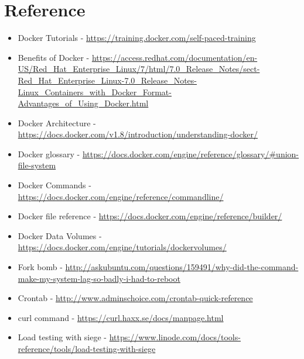 \documentclass[11pt]{article}
\begin{document}
\section{Reference}
\label{sec:orgheadline51}
\begin{itemize}
\item Docker Tutorials -  \url{https://training.docker.com/self-paced-training}
\item Benefits of Docker - \url{https://access.redhat.com/documentation/en-US/Red_Hat_Enterprise_Linux/7/html/7.0_Release_Notes/sect-Red_Hat_Enterprise_Linux-7.0_Release_Notes-Linux_Containers_with_Docker_Format-Advantages_of_Using_Docker.html}
\item Docker Architecture - \url{https://docs.docker.com/v1.8/introduction/understanding-docker/}
\item Docker glossary -  \url{https://docs.docker.com/engine/reference/glossary/#union-file-system}
\item Docker Commands - \url{https://docs.docker.com/engine/reference/commandline/}
\item Docker file reference - \url{https://docs.docker.com/engine/reference/builder/}
\item Docker Data Volumes - \url{https://docs.docker.com/engine/tutorials/dockervolumes/}

\item Fork bomb -
\url{http://askubuntu.com/questions/159491/why-did-the-command-make-my-system-lag-so-badly-i-had-to-reboot}
\item Crontab - \url{http://www.adminschoice.com/crontab-quick-reference}
\item curl command - \url{https://curl.haxx.se/docs/manpage.html}
\item Load testing with siege -
\url{https://www.linode.com/docs/tools-reference/tools/load-testing-with-siege}
\end{itemize}
\end{document}
